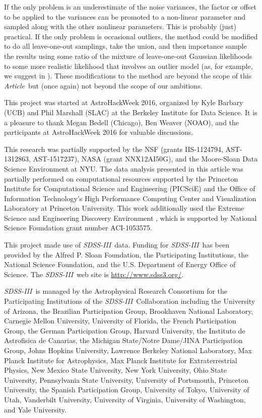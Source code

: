 \documentclass[manuscript, letterpaper]{aastex6}
\newcommand{\project}[1]{\textsl{#1}}
\newcommand{\acronym}[1]{{\small{#1}}}
\newcommand{\sdssiii}{\project{\acronym{SDSS-III}}}
\newcommand{\documentname}{\textsl{Article}}
\begin{document}
If the only problem is an underestimate of the noise variances, the
factor or offset to be applied to the variances can be promoted to a
non-linear parameter and sampled along with the other nonlinear parameters.
This is probably (just) practical.
If the only problem is occasional outliers, the method could be
modified to do all leave-one-out samplings, take the union, and then
importance sample the results using some ratio of the mixture of
leave-one-out Gaussian likelihoods to some more realistic likelihood
that involves an outlier model (as, for example, we suggest in
\cite{fittingalline}).
These modifications to the method are beyond the scope of this
\documentname\, but (once again) not beyond the scope of our ambitions.

\acknowledgements
This project was started at AstroHackWeek 2016, organized by Kyle
Barbary (UCB) and Phil Marshall (SLAC) at the Berkeley Institute for
Data Science.
It is a pleasure to thank
  Megan Bedell (Chicago),
  Ben Weaver (NOAO),
  and the participants at AstroHackWeek 2016
for valuable discussions.

This research was partially supported by
  the \acronym{NSF} (grants \acronym{IIS-1124794}, \acronym{AST-1312863}, \acronym{AST-1517237}),
  \acronym{NASA} (grant \acronym{NNX12AI50G}),
  and the Moore-Sloan Data Science Environment at \acronym{NYU}.
The data analysis presented in this article was partially performed on
computational resources supported by the Princeton Institute for Computational
Science and Engineering (PICSciE) and the Office of Information Technology's
High Performance Computing Center and Visualization Laboratory at Princeton
University.
This work additionally used the Extreme Science and Engineering Discovery
Environment \citep[XSEDE;][]{Towns:2014}, which is supported by National
Science Foundation grant number ACI-1053575.

This project made use of \sdssiii\ data. Funding for \sdssiii\ has been
provided by the Alfred P. Sloan Foundation, the Participating Institutions, the
National Science Foundation, and the \acronym{U.S.} Department of Energy Office
of Science. The \sdssiii\ web site is \url{http://www.sdss3.org/}.

\sdssiii\ is managed by the Astrophysical Research Consortium for the
Participating Institutions of the \sdssiii\ Collaboration including the
University of Arizona, the Brazilian Participation Group, Brookhaven National
Laboratory, Carnegie Mellon University, University of Florida, the French
Participation Group, the German Participation Group, Harvard University, the
Instituto de Astrofisica de Canarias, the Michigan State/Notre
Dame/\acronym{JINA} Participation Group, Johns Hopkins University, Lawrence
Berkeley National Laboratory, Max Planck Institute for Astrophysics, Max Planck
Institute for Extraterrestrial Physics, New Mexico State University, New York
University, Ohio State University, Pennsylvania State University, University of
Portsmouth, Princeton University, the Spanish Participation Group, University
of Tokyo, University of Utah, Vanderbilt University, University of Virginia,
University of Washington, and Yale University.
\end{document}
